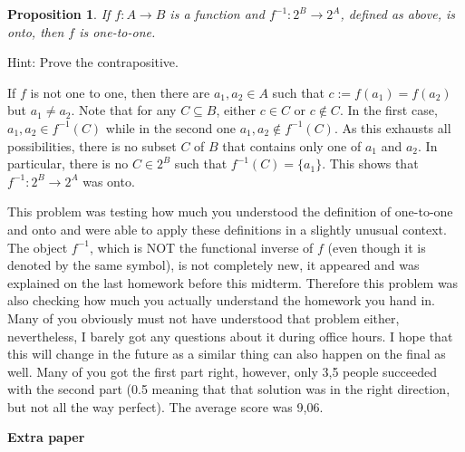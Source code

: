 \documentclass[12pt]{article}
\newtheorem*{proposition}{Proposition}
\begin{document}
\begin{enumerate}
\begin{enumerate}
\begin{proposition}
If $f:A\to B$ is a function and $f^{-1}:2^B\to 2^A$, defined as above, is onto, then $f$ is one-to-one. 
\end{proposition}
Hint: Prove the contrapositive.

If $f$ is not one to one, then there are $a_1,a_2\in A$ such that $c:=f(a_1)=f(a_2)$ but $a_1\neq a_2$. Note that for any $C\subseteq B$, either $c\in C$ or $c\notin C$. In the first case, $a_1,a_2\in f^{-1}(C)$ while in the second one $a_1,a_2\notin f^{-1}(C)$. As this exhausts all possibilities, there is no subset $C$ of $B$ that contains only one of $a_1$ and $a_2$. In particular, there is no $C\in 2^{B}$ such that $f^{-1}(C)=\{a_1\}$. This shows that $f^{-1}:2^B\to 2^A$ was onto.
\end{enumerate}
\vspace{4cm}

This problem was testing how much you understood the definition of one-to-one and onto and were able to apply these definitions in a slightly unusual context. The object $f^{-1}$, which is NOT the functional inverse of $f$ (even though it is denoted by the same symbol), is not completely new, it appeared and was explained on the last homework before this midterm. Therefore this problem was also checking how much you actually understand the homework you hand in. Many of you obviously must not have understood that problem either, nevertheless, I barely got any questions about it during office hours. I hope that this will change in the future as a similar thing can also happen on the final as well. Many of you got the first part right, however, only 3,5 people succeeded with the second part (0.5 meaning that that solution was in the right direction, but not all the way perfect). The average score was 9,06.

\end{enumerate}

\newpage
\noindent
\textbf{Extra paper}
%

%
\end{document}
